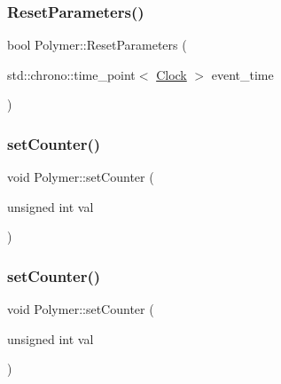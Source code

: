 \subsubsection{\texorpdfstring{Reset\+Parameters()}{ResetParameters()}}
{\footnotesize\ttfamily bool Polymer\+::\+Reset\+Parameters (\begin{DoxyParamCaption}\item[{std\+::chrono\+::time\+\_\+point$<$ \mbox{\hyperlink{universe_8h_a0ef8d951d1ca5ab3cfaf7ab4c7a6fd80}{Clock}} $>$}]{event\+\_\+time }\end{DoxyParamCaption})}

\mbox{\label{classPolymer_a7ed6bbe09a570b59f9253d63fd3326d2}} 
\subsubsection{\texorpdfstring{set\+Counter()}{setCounter()}\hspace{0.1cm}{\footnotesize\ttfamily [1/10]}}
{\footnotesize\ttfamily void Polymer\+::set\+Counter (\begin{DoxyParamCaption}\item[{unsigned int}]{val }\end{DoxyParamCaption})\hspace{0.3cm}{\ttfamily [inline]}}

\mbox{\label{classPolymer_a7ed6bbe09a570b59f9253d63fd3326d2}} 
\subsubsection{\texorpdfstring{set\+Counter()}{setCounter()}\hspace{0.1cm}{\footnotesize\ttfamily [2/10]}}
{\footnotesize\ttfamily void Polymer\+::set\+Counter (\begin{DoxyParamCaption}\item[{unsigned int}]{val }\end{DoxyParamCaption})\hspace{0.3cm}{\ttfamily [inline]}}

\mbox{\label{classPolymer_a7ed6bbe09a570b59f9253d63fd3326d2}} 
